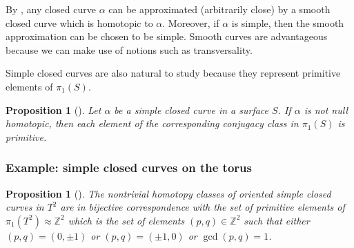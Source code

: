 \documentclass[reqno]{amsart}
\newtheorem{proposition}[theorem]{Proposition}
\theoremstyle{definition}
\theoremstyle{remark}
\begin{document}
By \cite[Thm~11.8]{Bredon}, any closed curve $\alpha$ can be approximated 
(arbitrarily close) by
a smooth closed curve which is homotopic to $\alpha$. Moreover,
if $\alpha$ is simple, then the smooth approximation can be chosen to be
simple. Smooth curves are advantageous because we can make use of notions
such as transversality.

Simple closed curves are also natural to study because they represent
primitive elements of $\pi_1 (S)$.

\begin{proposition}[]
    Let $\alpha$ be a simple closed curve in a surface $S$. If $\alpha$ 
    is not null homotopic, then each element of the corresponding conjugacy
    class in $\pi_1(S)$ is primitive.
\end{proposition}

\subsubsection{Example: simple closed curves on the torus}

\begin{proposition}[]\label{torus-primitive-elts}
    The nontrivial homotopy classes of oriented simple closed
    curves in $T^2$ are in bijective correspondence with the set of primitive
    elements of $\pi_1\left( T^2 \right) \approx \mathbb{Z}^2$ which is
    the set of elements $\left( p,q \right)  \in \mathbb{Z}^2$ such that
    either $(p,q) = (0,\pm 1)$ or  $(p,q) = (\pm 1,0)$ or
     $\gcd(p,q) = 1$.
\end{proposition}
\end{document}
